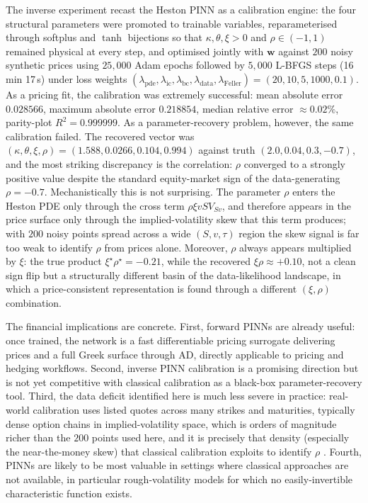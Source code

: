 The inverse experiment recast the Heston PINN as a calibration engine: the four structural parameters were promoted to trainable variables, reparameterised through softplus and $\tanh$ bijections so that $\kappa,\theta,\xi>0$ and $\rho\in(-1,1)$ remained physical at every step, and optimised jointly with $\boldsymbol{w}$ against $200$ noisy synthetic prices using $25{,}000$ Adam epochs followed by $5{,}000$ L-BFGS steps (16\,min 17\,s) under loss weights $(\lambda_{\mathrm{pde}},\lambda_{\mathrm{ic}},\lambda_{\mathrm{bc}},\lambda_{\mathrm{data}},\lambda_{\mathrm{Feller}})=(20,10,5,1000,0.1)$. As a pricing fit, the calibration was extremely successful: mean absolute error $0.028566$, maximum absolute error $0.218854$, median relative error $\approx 0.02\%$, parity-plot $R^2=0.999999$. As a parameter-recovery problem, however, the same calibration failed. The recovered vector was $(\kappa,\theta,\xi,\rho)=(1.588,0.0266,0.104,0.994)$ against truth $(2.0,0.04,0.3,-0.7)$, and the most striking discrepancy is the correlation: $\rho$ converged to a strongly positive value despite the standard equity-market sign of the data-generating $\rho=-0.7$. Mechanistically this is not surprising. The parameter $\rho$ enters the Heston PDE only through the cross term $\rho\xi vS V_{Sv}$, and therefore appears in the price surface only through the implied-volatility skew that this term produces; with $200$ noisy points spread across a wide $(S,v,\tau)$ region the skew signal is far too weak to identify $\rho$ from prices alone. Moreover, $\rho$ always appears multiplied by $\xi$: the true product $\xi^\star\rho^\star=-0.21$, while the recovered $\xi\rho\approx+0.10$, not a clean sign flip but a structurally different basin of the data-likelihood landscape, in which a price-consistent representation is found through a different $(\xi,\rho)$ combination.

The financial implications are concrete. First, forward PINNs are already useful: once trained, the network is a fast differentiable pricing surrogate delivering prices and a full Greek surface through AD, directly applicable to pricing and hedging workflows. Second, inverse PINN calibration is a promising direction but is not yet competitive with classical calibration \parencite{andersen2008simple,rouah2013heston,lord2010comparison} as a black-box parameter-recovery tool. Third, the data deficit identified here is much less severe in practice: real-world calibration uses listed quotes across many strikes and maturities, typically dense option chains in implied-volatility space, which is orders of magnitude richer than the $200$ points used here, and it is precisely that density (especially the near-the-money skew) that classical calibration exploits to identify $\rho$ \parencite{gatheral2018volatility,horvath2021deep}. Fourth, PINNs are likely to be most valuable in settings where classical approaches are not available, in particular rough-volatility models \parencite{bayer2016rough,euch2019roughheston} for which no easily-invertible characteristic function exists.

